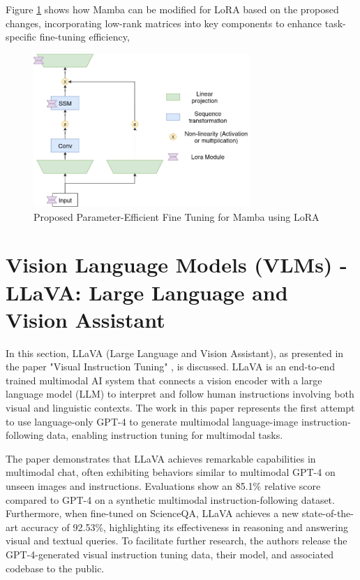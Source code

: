 \documentclass[12pt, conference, compsoc, onecolumn]{IEEEtran}
\begin{document}
	Figure \ref{fig:lora_mamba} shows how Mamba can be modified for LoRA based on the proposed changes, incorporating low-rank matrices into key components to enhance task-specific fine-tuning efficiency, 
	
	\begin{figure}[H]
		\centering
		\includegraphics[width=0.73\textwidth]{figures/lora_mamba.png}
		\caption{Proposed Parameter-Efficient Fine Tuning for Mamba using LoRA}
		\label{fig:lora_mamba}
	\end{figure}
	
	
	
	\newpage
	\section{Vision Language Models (VLMs) - LLaVA: Large Language and Vision Assistant}
	
	In this section, LLaVA (Large Language and Vision Assistant), as presented in the paper "Visual Instruction Tuning" \cite{liu2023llava}, is discussed. LLaVA is an end-to-end trained multimodal AI system that connects a vision encoder with a large language model (LLM) to interpret and follow human instructions involving both visual and linguistic contexts. The work in this paper represents the first attempt to use language-only GPT-4 to generate multimodal language-image instruction-following data, enabling instruction tuning for multimodal tasks.
	
	The paper demonstrates that LLaVA achieves remarkable capabilities in multimodal chat, often exhibiting behaviors similar to multimodal GPT-4 on unseen images and instructions. Evaluations show an 85.1\% relative score compared to GPT-4 on a synthetic multimodal instruction-following dataset. Furthermore, when fine-tuned on ScienceQA, LLaVA achieves a new state-of-the-art accuracy of 92.53\%, highlighting its effectiveness in reasoning and answering visual and textual queries. To facilitate further research, the authors release the GPT-4-generated visual instruction tuning data, their model, and associated codebase to the public.
	
\end{document}
